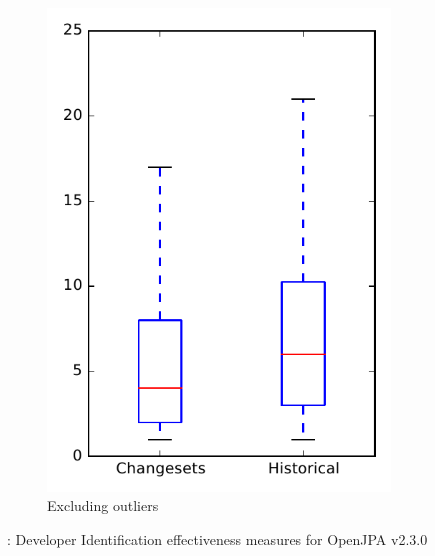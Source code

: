 \begin{figure}
\begin{subfigure}{.4\textwidth}
        \includegraphics[height=0.4\textheight]{figures/dit/rq2_openjpa_no_outlier}
        \caption{Excluding outliers}\label{fig:dit:rq2:openjpa_no_outlier}
    \end{subfigure}
\caption{\dtwo: Developer Identification effectiveness measures for OpenJPA v2.3.0}
\label{fig:dit:rq2:openjpa}
\end{figure}

